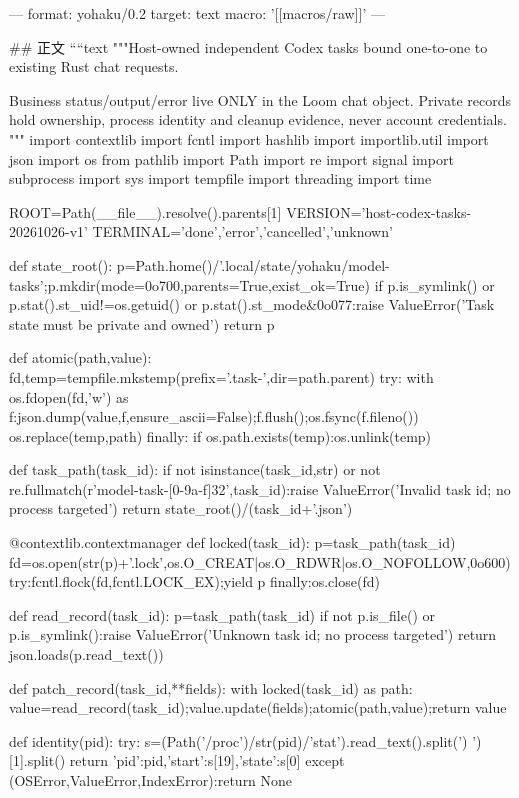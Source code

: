 ---
format: yohaku/0.2
target: text
macro: '[[macros/raw]]'
---

## 正文
````text
"""Host-owned independent Codex tasks bound one-to-one to existing Rust chat requests.

Business status/output/error live ONLY in the Loom chat object. Private records
hold ownership, process identity and cleanup evidence, never account credentials.
"""
import contextlib
import fcntl
import hashlib
import importlib.util
import json
import os
from pathlib import Path
import re
import signal
import subprocess
import sys
import tempfile
import threading
import time

ROOT=Path(__file__).resolve().parents[1]
VERSION='host-codex-tasks-20261026-v1'
TERMINAL={'done','error','cancelled','unknown'}


def state_root():
    p=Path.home()/'.local/state/yohaku/model-tasks';p.mkdir(mode=0o700,parents=True,exist_ok=True)
    if p.is_symlink() or p.stat().st_uid!=os.getuid() or p.stat().st_mode&0o077:raise ValueError('Task state must be private and owned')
    return p


def atomic(path,value):
    fd,temp=tempfile.mkstemp(prefix='.task-',dir=path.parent)
    try:
        with os.fdopen(fd,'w') as f:json.dump(value,f,ensure_ascii=False);f.flush();os.fsync(f.fileno())
        os.replace(temp,path)
    finally:
        if os.path.exists(temp):os.unlink(temp)


def task_path(task_id):
    if not isinstance(task_id,str) or not re.fullmatch(r'model-task-[0-9a-f]{32}',task_id):raise ValueError('Invalid task id; no process targeted')
    return state_root()/(task_id+'.json')


@contextlib.contextmanager
def locked(task_id):
    p=task_path(task_id)
    fd=os.open(str(p)+'.lock',os.O_CREAT|os.O_RDWR|os.O_NOFOLLOW,0o600)
    try:fcntl.flock(fd,fcntl.LOCK_EX);yield p
    finally:os.close(fd)


def read_record(task_id):
    p=task_path(task_id)
    if not p.is_file() or p.is_symlink():raise ValueError('Unknown task id; no process targeted')
    return json.loads(p.read_text())


def patch_record(task_id,**fields):
    with locked(task_id) as path:
        value=read_record(task_id);value.update(fields);atomic(path,value);return value


def identity(pid):
    try:
        s=(Path('/proc')/str(pid)/'stat').read_text().split(') ')[1].split()
        return {'pid':pid,'start':s[19],'state':s[0]}
    except (OSError,ValueError,IndexError):return None


